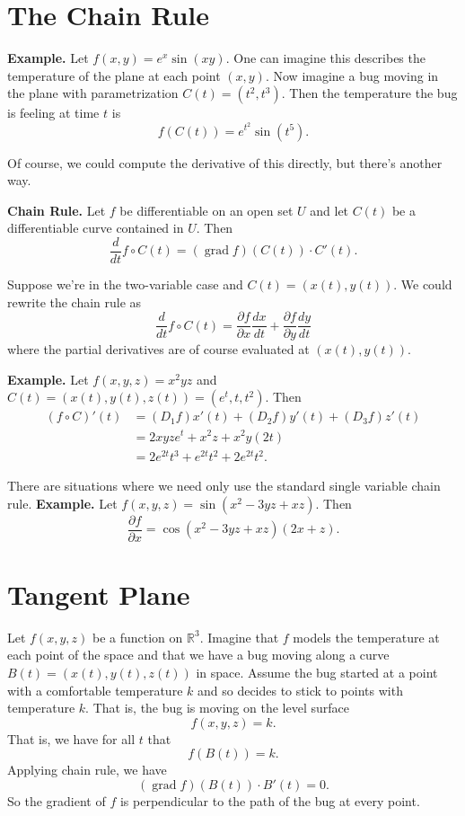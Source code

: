 \documentclass{article}
\DeclareMathOperator{\grd}{grad}
\begin{document}
\section*{The Chain Rule}

\textbf{Example.} Let $f(x,y) = e^x \sin(xy)$. One can imagine
this describes the temperature of the plane at each point $(x,y)$.
Now imagine a bug moving in the plane with parametrization
$C(t) = (t^2, t^3)$. Then the temperature the bug is feeling at time $t$
is 
\[f(C(t))=e^{t^2}\sin(t^5).\]

Of course, we could compute the derivative of this directly,
but there's another way.

\textbf{Chain Rule.} Let $f$ be differentiable on an open set $U$
and let $C(t)$ be a differentiable curve contained in $U$. Then 
\[\frac{d}{dt} f\circ C(t) = (\grd f)(C(t)) \cdot C'(t).\]

Suppose we're in the two-variable case and 
$C(t) = (x(t),y(t))$. We could rewrite the chain rule as
\[\frac{d}{dt} f\circ C(t) = \frac{\partial f}{\partial x} \frac{dx}{dt} + \frac{\partial f}{\partial y} \frac{dy}{dt}\]
where the partial derivatives are of course evaluated at $(x(t),y(t))$.

\textbf{Example.} Let $f(x,y,z) = x^2 y z$ and 
$C(t) = (x(t),y(t),z(t)) = (e^t, t, t^2)$.
Then 
\begin{align*}
(f\circ C)'(t) &= (D_1 f) x'(t) + (D_2 f) y'(t) + (D_3 f) z'(t)\\
&= 2xyz e^t + x^2 z  + x^2 y (2t)\\
&= 2e^{2t} t^3 + e^{2t} t^2 + 2e^{2t} t^2.
\end{align*}

There are situations where we need only use the standard single variable chain rule.
\textbf{Example.}
Let $f(x,y,z)=\sin(x^2-3yz+xz)$.
Then 
\[\frac{\partial f}{\partial x} = \cos(x^2-3yz+xz)(2x + z).\]

\section*{Tangent Plane}
Let $f(x,y,z)$ be a function on $\mathbb{R}^3$. Imagine that $f$ models the 
temperature at each point of the space and that we have
a bug moving along a curve $B(t) = (x(t),y(t),z(t))$ in space. 
Assume the bug started at a point with a comfortable temperature $k$
and so decides to stick to points with temperature $k$. That is,
the bug is moving on the level surface
\[f(x,y,z)=k.\]
That is, we have for all $t$ that
\[f(B(t))=k.\]
Applying chain rule, we have
\[(\grd f)(B(t))\cdot B'(t) = 0.\]
So the gradient of $f$ is perpendicular to the path of the bug
at every point.
\end{document}
